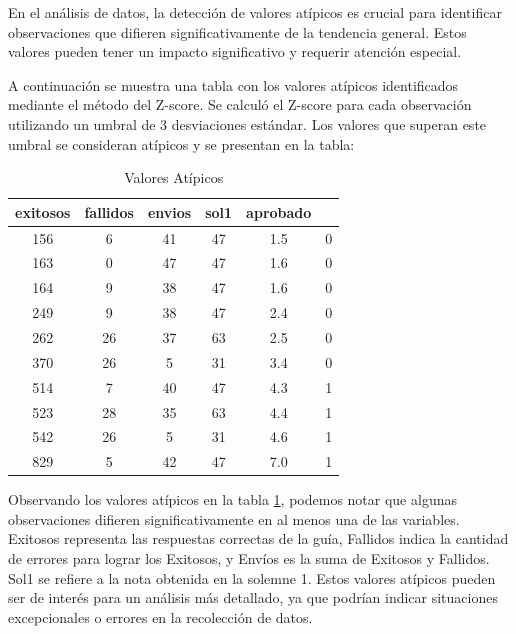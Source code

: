 En el análisis de datos, la detección de valores atípicos es crucial para
identificar observaciones que difieren significativamente de la tendencia
general. Estos valores pueden tener un impacto significativo y requerir
atención especial.

A continuación se muestra una tabla con los valores atípicos identificados
mediante el método del Z-score. Se calculó el Z-score para cada observación
utilizando un umbral de 3 desviaciones estándar. Los valores que superan este
umbral se consideran atípicos y se presentan en la tabla:

\begin{table}[htbp]
    \centering
    \caption{Valores Atípicos}
    \begin{tabular}{cccccc}
        \hline
        \textbf{exitosos} & \textbf{fallidos} & \textbf{envios} & \textbf{sol1} & \textbf{aprobado} \\
        \hline
        156               & 6                 & 41              & 47            & 1.5               & 0                 \\
        163               & 0                 & 47              & 47            & 1.6               & 0                 \\
        164               & 9                 & 38              & 47            & 1.6               & 0                 \\
        249               & 9                 & 38              & 47            & 2.4               & 0                 \\
        262               & 26                & 37              & 63            & 2.5               & 0                 \\
        370               & 26                & 5               & 31            & 3.4               & 0                 \\
        514               & 7                 & 40              & 47            & 4.3               & 1                 \\
        523               & 28                & 35              & 63            & 4.4               & 1                 \\
        542               & 26                & 5               & 31            & 4.6               & 1                 \\
        829               & 5                 & 42              & 47            & 7.0               & 1                 \\
        \hline
    \end{tabular}
    \label{tab:valores_atipicos}
\end{table}

Observando los valores atípicos en la tabla \ref{tab:valores_atipicos}, podemos
notar que algunas observaciones difieren significativamente en al menos una de
las variables. Exitosos representa las respuestas correctas de la guía, 
Fallidos indica la cantidad de errores para lograr los Exitosos, y Envíos es la suma de Exitosos y Fallidos. 
Sol1 se refiere a la nota obtenida en la solemne 1. Estos valores atípicos pueden ser de interés para un análisis más detallado, 
ya que podrían indicar situaciones excepcionales o errores en la recolección de datos.